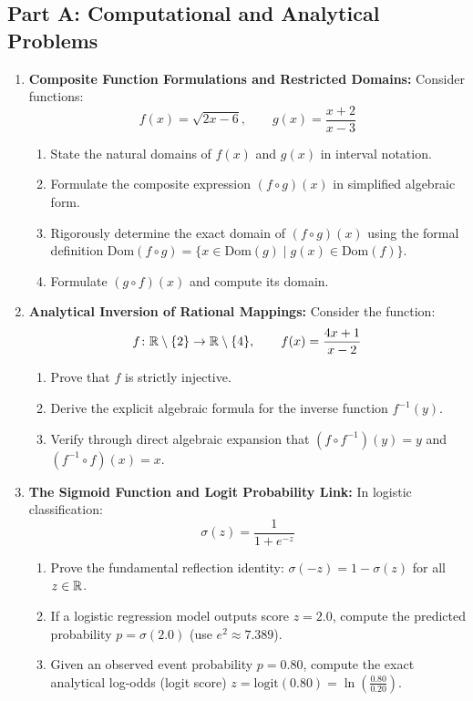 \subsection*{Part A: Computational and Analytical Problems}

\begin{enumerate}
    \item \textbf{Composite Function Formulations and Restricted Domains:} Consider functions:
    $$f(x) = \sqrt{2x - 6}, \qquad g(x) = \frac{x + 2}{x - 3}$$
    \begin{enumerate}
        \item State the natural domains of $f(x)$ and $g(x)$ in interval notation.
        \item Formulate the composite expression $(f \circ g)(x)$ in simplified algebraic form.
        \item Rigorously determine the exact domain of $(f \circ g)(x)$ using the formal definition $\text{Dom}(f \circ g) = \{x \in \text{Dom}(g) \mid g(x) \in \text{Dom}(f)\}$.
        \item Formulate $(g \circ f)(x)$ and compute its domain.
    \end{enumerate}

    \item \textbf{Analytical Inversion of Rational Mappings:} Consider the function:
    $$f \colon \mathbb{R} \setminus \{2\} \to \mathbb{R} \setminus \{4\}, \qquad f(x) = \frac{4x + 1}{x - 2}$$
    \begin{enumerate}
        \item Prove that $f$ is strictly injective.
        \item Derive the explicit algebraic formula for the inverse function $f^{-1}(y)$.
        \item Verify through direct algebraic expansion that $(f \circ f^{-1})(y) = y$ and $(f^{-1} \circ f)(x) = x$.
    \end{enumerate}

    \item \textbf{The Sigmoid Function and Logit Probability Link:} In logistic classification:
    $$\sigma(z) = \frac{1}{1 + e^{-z}}$$
    \begin{enumerate}
        \item Prove the fundamental reflection identity: $\sigma(-z) = 1 - \sigma(z)$ for all $z \in \mathbb{R}$.
        \item If a logistic regression model outputs score $z = 2.0$, compute the predicted probability $p = \sigma(2.0)$ (use $e^2 \approx 7.389$).
        \item Given an observed event probability $p = 0.80$, compute the exact analytical log-odds (logit score) $z = \text{logit}(0.80) = \ln\left(\frac{0.80}{0.20}\right)$.
    \end{enumerate}


\end{enumerate}
